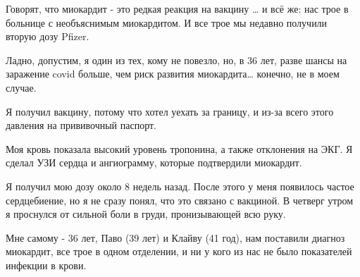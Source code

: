 Говорят, что миокардит - это редкая реакция на вакцину … и всё же: нас трое в
больнице с необъяснимым миокардитом. И все трое мы недавно получили вторую дозу
Pfizer.

Ладно, допустим, я один из тех, кому не повезло, но, в 36 лет, разве шансы на
заражение covid больше, чем риск развития миокардита… конечно, не в моем случае.

Я получил вакцину, потому что хотел уехать за границу, и из-за всего этого
давления на прививочный паспорт.

Моя кровь показала высокий уровень тропонина, а также отклонения на ЭКГ. Я
сделал УЗИ сердца и ангиограмму, которые подтвердили миокардит.

Я получил мою дозу около 8 недель назад. После этого у меня появилось частое
сердцебиение, но я не сразу понял, что это связано с вакциной. В четверг утром я
проснулся от сильной боли в груди, пронизывающей всю руку.

Мне самому - 36 лет, Паво (39 лет) и Клайву (41 год), нам поставили диагноз
миокардит, все трое в одном отделении, и ни у кого из нас не было показателей
инфекции в крови.
